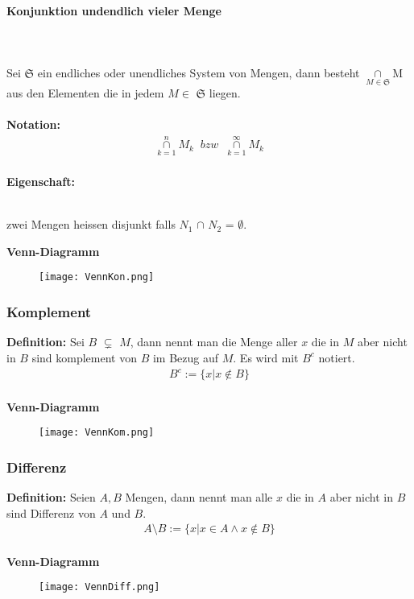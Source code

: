 \documentclass[../AbiMappe_Mathe.tex]{subfiles}
\begin{document}
\paragraph{Konjunktion undendlich vieler Menge}
		\hspace{0 cm} \\ \noindent \\
		Sei $\mathfrak{S}$ ein endliches oder unendliches System von Mengen, dann besteht $\underset{M \in \mathfrak{S}}{\cap}$M aus den Elementen die in jedem $M \in  $ $\mathfrak{S}$ liegen.\\\\
\textbf{Notation:}\\
\begin{align*}
\underset{k=1}{\overset{n}{\cap}}M_k \;\;bzw\;\; \underset{k=1}{\overset{\infty}{\cap}}M_k
\end{align*}\\
\textbf{Eigenschaft:}\\
\\
\begin{description}
\vspace{-1cm}
\item[$\bullet$]zwei Mengen heissen disjunkt falls $N_1$ $\cap$ $N_2$ = $\emptyset$.
\end{description}
\textbf{Venn-Diagramm}
\begin{figure}[H]
\centering
\texttt{[image: VennKon.png]}
\end{figure}

\subsubsection{Komplement}
\textbf{Definition:} Sei $B$ $\subsetneq$ $M$, dann nennt man die Menge aller $x$ die in $M$ aber nicht in $B$ sind komplement von $B$ im Bezug auf $M$. Es wird mit $B^c$ notiert.
\begin{align*}
B^c:=\{x|x \notin B\}
\end{align*}
\\
\textbf{Venn-Diagramm}
\begin{figure}[H]
\centering
\texttt{[image: VennKom.png]}
\end{figure}


\subsubsection{Differenz}
\textbf{Definition:} Seien $A,B$ Mengen, dann nennt man alle $x$ die in $A$ aber nicht in $B$ sind Differenz von $A$ und $B$.
\begin{align*}
A \setminus B:=\{x|x \in A \land x \notin B\}
\end{align*}
\\
\textbf{Venn-Diagramm}
\begin{figure}[H]
\centering
\texttt{[image: VennDiff.png]}
\end{figure}
\end{document}
